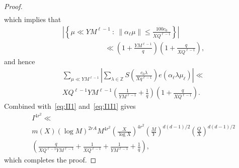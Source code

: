 \documentclass[10pt,a4paper]{amsart}
\def\Z{{\mathbb Z}}
\def\le{\leqslant}
\begin{document}
\begin{proof}
\begin{align*}
\end{align*}
which implies that 
\begin{align*}
&\left|\left\{ \mu \ll YM^{\ell-1} \ : \ \|\alpha_{\ell}\mu\|  \le \frac{100c_0}{XQ^{\ell-1}} \right\}\right|\\ & \quad \quad \quad \quad \quad \quad \ll \left(1+\frac{YM^{\ell-1}}{q} \right)\left(1+\frac{q}{XQ^{\ell-1}}\right),
\end{align*}
and hence 
\begin{align*}
&\sum_{\mu\ll YM^{\ell-1}}\left|\sum_{\lambda \in \Z}S\left(\frac{c_0\lambda}{Xq^{\ell-1}}\right)e(\alpha_\ell \lambda \mu_\ell)\right|\ll \\ & XQ^{\ell-1}YM^{\ell-1}\left(\frac{1}{YM^{\ell-1}}+\frac{1}{q} \right)\left(1+\frac{q}{XQ^{\ell-1}}\right).
\end{align*}
Combined with~\eqref{eq:II1} and~\eqref{eq:I1I1} gives 
\begin{align*}
& I^{4r^2}\ll \\ & m(X)(\log{M})^{2rA}M^{4r^2}\left(\frac{X}{\log{X}}\right)^{4r^2} \left(\frac{M}{Y}\right)^{d(d-1)/2}\left(\frac{Q}{X}\right)^{d(d-1)/2} \\ & \left(\frac{q}{XQ^{\ell-1}YM^{\ell-1}}+\frac{1}{XQ^{\ell-1}}+\frac{1}{YM^{\ell-1}}+\frac{1}{q}\right),
\end{align*}
which completes the proof.
\end{proof}
\end{document}
